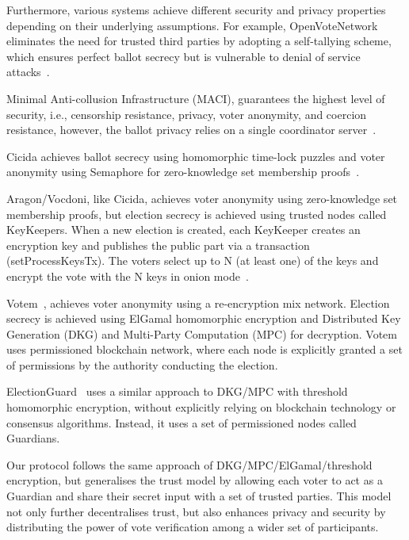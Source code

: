 \documentclass[runningheads]{llncs}
\begin{document}
Furthermore, various systems achieve different security and privacy properties depending on their underlying assumptions. For example, OpenVoteNetwork eliminates the need for trusted third parties by adopting a self-tallying scheme, which ensures perfect ballot secrecy but is vulnerable to denial of service attacks~\cite{haoAnonymousVotingTworound2010, mccorrySmartContractBoardroom2017, seifelnasrScalableOpenVoteNetwork2020, elsheikhDisputefreeScalableOpen2022}.

Minimal Anti-collusion Infrastructure (MACI), guarantees the highest level of security, i.e., censorship resistance, privacy, voter anonymity, and coercion resistance, however, the ballot privacy relies on a single coordinator server~\cite{ethereumfoundationMinimalAntiCollusionInfrastructure2022, PrivacyscalingexplorationsMaci2023}.

Cicida achieves ballot secrecy using homomorphic time-lock puzzles and voter anonymity using Semaphore for zero-knowledge set membership proofs~\cite{BuildingCicadaPrivate, A16zCicada2023}.

Aragon/Vocdoni, like Cicida, achieves voter anonymity using zero-knowledge set membership proofs, but election secrecy is achieved using trusted nodes called KeyKeepers. When a new election is created, each KeyKeeper creates an encryption key and publishes the public part via a transaction (setProcessKeysTx). The voters select up to N (at least one) of the keys and encrypt the vote with the N keys in onion mode~\cite{williamsRemoteVotingAge2022, VocdoniIntroductionVocdoni}. 

Votem~\cite{votemcorpVotemProofofvoteVotem}, achieves voter anonymity using a re-encryption mix network. Election secrecy is achieved using ElGamal homomorphic encryption and Distributed Key Generation (DKG) and Multi-Party Computation (MPC) for decryption. Votem uses permissioned blockchain network, where each node is explicitly granted a set of permissions by the authority conducting the election.

ElectionGuard~\cite{benalohElectionGuardDesignSpecification2023} uses a similar approach to DKG/MPC with threshold homomorphic encryption, without explicitly relying on blockchain technology or consensus algorithms. Instead, it uses a set of permissioned nodes called Guardians.

Our protocol follows the same approach of DKG/MPC/ElGamal/threshold encryption, but generalises the trust model by allowing each voter to act as a Guardian and share their secret input with a set of trusted parties. This model not only further decentralises trust, but also enhances privacy and security by distributing the power of vote verification among a wider set of participants. 
\end{document}
